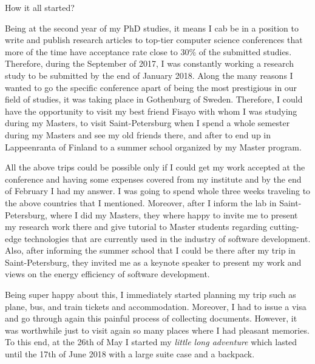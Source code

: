 \documentclass[10pt,a4paper]{article} %
\newcommand{\NewsItem}[1]{ %
\usefont{T1}{fvs}{n}{n} %
\vspace{24pt}\large #1\vspace{3pt} %
\par \normalsize \normalfont}
\begin{document}
\begin{multicols}{3} %


\NewsItem{How it all started?}
Being at the second year of my PhD studies, it means I cab be in a position to write
and publish research articles to top-tier computer science conferences that more of the time
have acceptance rate close to 30\% of the submitted studies.
Therefore, during the September of 2017, I was constantly working a research study
to be submitted by the end of January 2018.
Along the many reasons I wanted to go the specific conference apart of being the most
prestigious in our field of studies, it was taking place in Gothenburg of Sweden.
Therefore, I could have the opportunity to visit my best friend Fisayo with whom I was
studying during my Masters, to visit Saint-Petersburg when I spend a whole semester
during my Masters and see my old friends there, and after to end up in Lappeenranta
of Finland to a summer school organized by my Master program.

All the above trips could be possible only if I could get my work accepted at the conference
and having some expenses covered from my institute and by the end of February I had my answer.
I was going to spend whole three weeks traveling to the above countries that I mentioned.
Moreover, after I inform the lab in Saint-Petersburg, where I did my Masters, they where
happy to invite me to present my research work there and give tutorial to Master students
regarding cutting-edge technologies that are currently used in the industry of software development.
Also, after informing the summer school that I could be there after my trip in Saint-Petersburg,
they invited me as a keynote speaker to present my work and views on the energy efficiency
of software development.

Being super happy about this, I immediately started planning my trip such as plane, bus, and
train tickets and accommodation.
Moreover, I had to issue a visa and go through again this painful process of collecting documents.
However, it was worthwhile just to visit again so many places where I had pleasant memories.
To this end, at the 26th of May I started my {\it little long adventure} which lasted until
the 17th of June 2018 with a large suite case and a backpack.



\end{multicols}
\end{document}
